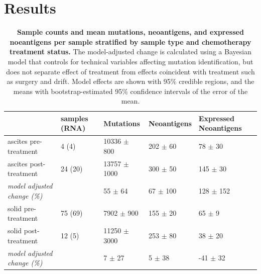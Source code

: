 \section*{Results}

\begin{table}[htbp]


\begin{tabular}{lllll}
\toprule
{} & samples (RNA) &         Mutations &   Neoantigens & Expressed Neoantigens \\
\midrule
ascites pre-treatment                 &         4 (4) &   10336 $\pm$ 800 &  202 $\pm$ 60 &           78 $\pm$ 30 \\
ascites post-treatment                &       24 (20) &  13757 $\pm$ 1000 &  300 $\pm$ 50 &          145 $\pm$ 30 \\
\textit{model adjusted change (\%)} &               &       55 $\pm$ 64 &  67 $\pm$ 100 &         128 $\pm$ 152 \\
\hline
solid pre-treatment                   &       75 (69) &    7902 $\pm$ 900 &  155 $\pm$ 20 &            65 $\pm$ 9 \\
solid post-treatment                  &        12 (5) &  11250 $\pm$ 3000 &  253 $\pm$ 80 &           38 $\pm$ 20 \\
\textit{model adjusted change (\%)}   &               &        7 $\pm$ 27 &    5 $\pm$ 38 &          -41 $\pm$ 32 \\
\bottomrule
\end{tabular}



\caption{\textbf{Sample counts and mean mutations, neoantigens, and expressed noeantigens per sample stratified by sample type and chemotherapy treatment status.} The model-adjusted change is calculated using a Bayesian model that controls for technical variables affecting mutation identification, but does not separate effect of treatment from effects coincident with treatment such as surgery and drift. Model effects are shown with 95\% credible regions, and the means with bootstrap-estimated 95\% confidence intervals of the error of the mean.}
\label{tab:cohort}
\end{table}

